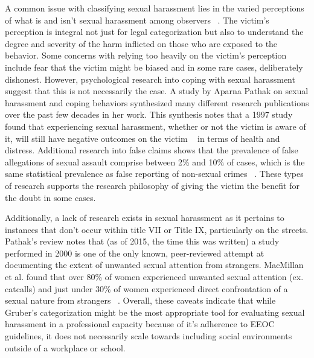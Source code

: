 A common issue with classifying sexual harassment lies in the varied perceptions of what is and isn't sexual harassment among observers ~\cite{studzinska2015perception}. The victim's perception is integral not just for legal categorization but also to understand the degree and severity of the harm inflicted on those who are exposed to the behavior. Some concerns with relying too heavily on the victim's perception include fear that the victim might be biased and in some rare cases, deliberately dishonest. However, psychological research into coping with sexual harassment suggest that this is not necessarily the case. A study by Aparna Pathak on sexual harassment and coping behaviors synthesized many different research publications over the past few decades in her work. This synthesis notes that a 1997 study found that experiencing sexual harassment, whether or not the victim is aware of it, will still have negative outcomes on the victim ~\cite{schneider1997effects} in terms of health and distress. Additional research into false claims shows that the prevalence of false allegations of sexual assault comprise between 2\% and 10\% of cases, which is the same statistical prevalence as false reporting of non-sexual crimes ~\cite{falseallegations2010}. These types of research supports the research philosophy of giving the victim the benefit for the doubt in some cases.

Additionally, a lack of research exists in sexual harassment as it pertains to instances that don't occur within title VII or Title IX, particularly on the streets. Pathak's review notes that (as of 2015, the time this was written) a study performed in 2000 is one of the only known, peer-reviewed attempt at documenting the extent of unwanted sexual attention from strangers. MacMillan et al. found that over 80\% of women experienced unwanted sexual attention (ex. catcalls) and just under 30\% of women experienced direct confrontation of a sexual nature from strangers ~\cite{macmillan2000street}. Overall, these caveats indicate that while Gruber's categorization might be the most appropriate tool for evaluating sexual harassment in a professional capacity because of it's adherence to EEOC guidelines, it does not necessarily scale towards including social environments outside of a workplace or school.

